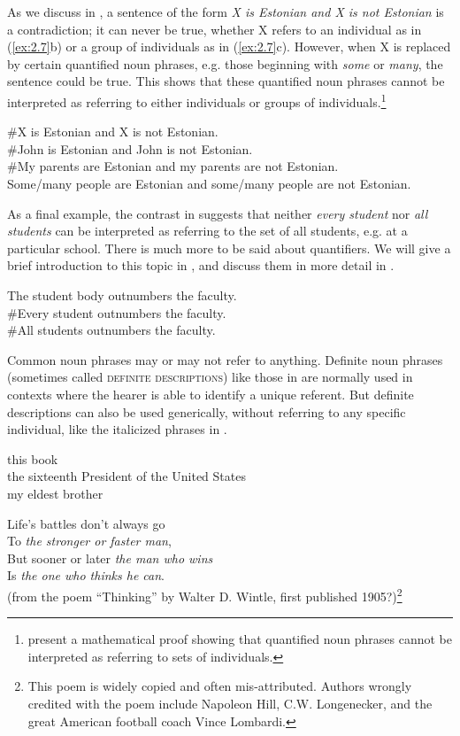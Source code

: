 As we discuss in , a sentence of the form \textit{X is Estonian and X is not Estonian} is a contradiction; it can never be true, whether X refers to an individual as in (\ref{ex:2.7}b) or a group of individuals as in (\ref{ex:2.7}c). However, when X is replaced by certain quantified noun phrases, e.g. those beginning with \textit{some} or \textit{many}, the sentence could be true. This shows that these quantified noun phrases cannot be interpreted as referring to either individuals or groups of individuals.\footnote{\citet[49–52]{PetersWesterståhl2006} present a mathematical proof showing that quantified noun phrases cannot be interpreted as referring to sets of individuals.}


\ea  \label{ex:2.7}
\ea \#X is Estonian and X is not Estonian.\\
\ex \#John is Estonian and John is not Estonian.\\
\ex \#My parents are Estonian and my parents are not Estonian.\\
\ex Some/many people are Estonian and some/many people are not Estonian.
\z
\z


As a final example, the contrast in  suggests that neither \textit{every student} nor \textit{all students} can be interpreted as referring to the set of all students, e.g. at a particular school. There is much more to be said about quantifiers. We will give a brief introduction to this topic in , and discuss them in more detail in .


\ea \label{ex:2.8}
\ea The student body outnumbers the faculty.\\                
\ex \#Every student outnumbers the faculty.\\
\ex \#All students outnumbers the faculty.
\z
\z


Common noun phrases may or may not refer to anything. Definite noun phrases (sometimes called \textsc{definite descriptions}) like those in  are normally used in contexts where the hearer is able to identify a unique referent. But definite descriptions can also be used generically, without referring to any specific individual, like the italicized phrases in .


\ea \label{ex:2.9}
\ea this book\\
\ex the sixteenth President of the United States\\
\ex my eldest brother
                       \z
\z

\ea \label{ex:2.10}
Life’s battles don’t always go\\
   To \textit{the stronger or faster man},\\
But sooner or later \textit{the man who wins}\\
   Is \textit{the one who thinks he can}.\\
(from the poem “Thinking” by Walter D. Wintle, first published 1905?)\footnote{This poem is widely copied and often mis-attributed. Authors wrongly credited with the poem include Napoleon Hill, C.W. Longenecker, and the great American football coach Vince Lombardi.}
\z


